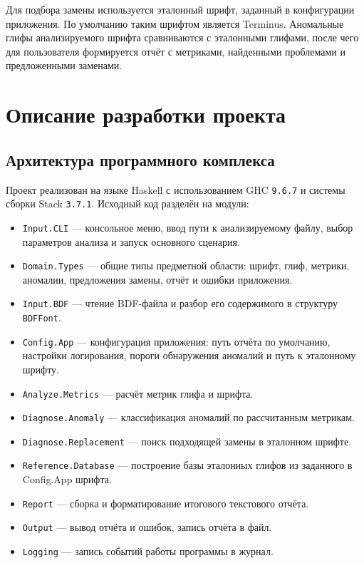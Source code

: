 Для подбора замены используется эталонный шрифт, заданный в конфигурации приложения. По умолчанию таким шрифтом является Terminus. Аномальные глифы анализируемого шрифта сравниваются с эталонными глифами, после чего для пользователя формируется отчёт с метриками, найденными проблемами и предложенными заменами.

\newpage

\section{Описание разработки проекта}
\label{sec:implementation}

\subsection{Архитектура программного комплекса}

Проект реализован на языке Haskell с использованием GHC \texttt{9.6.7} и системы сборки Stack \texttt{3.7.1}. Исходный код разделён на модули:

\begin{itemize}
    \item \texttt{Input.CLI} --- консольное меню, ввод пути к анализируемому файлу, выбор параметров анализа и запуск основного сценария.
    \item \texttt{Domain.Types} --- общие типы предметной области: шрифт, глиф, метрики, аномалии, предложения замены, отчёт и ошибки приложения.
    \item \texttt{Input.BDF} --- чтение BDF-файла и разбор его содержимого в структуру \texttt{BDFFont}.
    \item \texttt{Config.App} --- конфигурация приложения: путь отчёта по умолчанию, настройки логирования, пороги обнаружения аномалий и путь к эталонному шрифту.
    \item \texttt{Analyze.Metrics} --- расчёт метрик глифа и шрифта.
    \item \texttt{Diagnose.Anomaly} --- классификация аномалий по рассчитанным метрикам.
    \item \texttt{Diagnose.Replacement} --- поиск подходящей замены в эталонном шрифте.
    \item \texttt{Reference.Database} --- построение базы эталонных глифов из заданного в Config.App шрифта.
    \item \texttt{Report} --- сборка и форматирование итогового текстового отчёта.
    \item \texttt{Output} --- вывод отчёта и ошибок, запись отчёта в файл.
    \item \texttt{Logging} --- запись событий работы программы в журнал.
\end{itemize}

